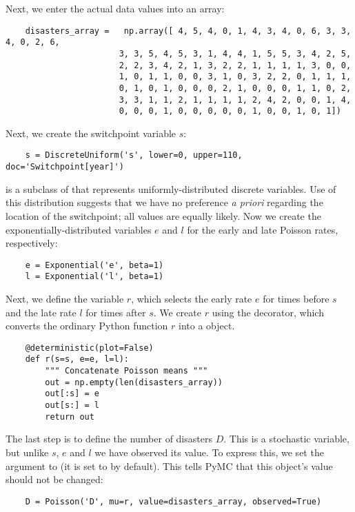 Next, we enter the actual data values into an array:
\begin{verbatim}
	disasters_array =   np.array([ 4, 5, 4, 0, 1, 4, 3, 4, 0, 6, 3, 3, 4, 0, 2, 6,
	                   3, 3, 5, 4, 5, 3, 1, 4, 4, 1, 5, 5, 3, 4, 2, 5,
	                   2, 2, 3, 4, 2, 1, 3, 2, 2, 1, 1, 1, 1, 3, 0, 0,
	                   1, 0, 1, 1, 0, 0, 3, 1, 0, 3, 2, 2, 0, 1, 1, 1,
	                   0, 1, 0, 1, 0, 0, 0, 2, 1, 0, 0, 0, 1, 1, 0, 2,
	                   3, 3, 1, 1, 2, 1, 1, 1, 1, 2, 4, 2, 0, 0, 1, 4,
	                   0, 0, 0, 1, 0, 0, 0, 0, 0, 1, 0, 0, 1, 0, 1])
\end{verbatim} 
Next, we create the switchpoint variable $s$:
\begin{verbatim}
	s = DiscreteUniform('s', lower=0, upper=110, doc='Switchpoint[year]')  
\end{verbatim}
 is a subclass of  that represents uniformly-distributed discrete variables. Use of this distribution suggests that we have no preference \emph{a priori} regarding the location of the switchpoint; all values are equally likely. Now we create the exponentially-distributed variables $e$ and $l$ for the early and late Poisson rates, respectively:
\begin{verbatim}
	e = Exponential('e', beta=1)
	l = Exponential('l', beta=1)   
\end{verbatim}
Next, we define the variable $r$, which selects the early rate $e$ for times before $s$ and the late rate $l$ for times after $s$. We create $r$ using the  decorator, which converts the ordinary Python function $r$ into a  object.
\begin{verbatim}
	@deterministic(plot=False)
	def r(s=s, e=e, l=l):
		""" Concatenate Poisson means """
	    out = np.empty(len(disasters_array))
	    out[:s] = e
	    out[s:] = l
	    return out
\end{verbatim}
The last step is to define the number of disasters $D$. This is a stochastic variable, but unlike $s$, $e$ and $l$ we have observed its value. To express this, we set the argument  to  (it is set to  by default). This tells PyMC that this object's value should not be changed:
\begin{verbatim}
	D = Poisson('D', mu=r, value=disasters_array, observed=True)
\end{verbatim}

